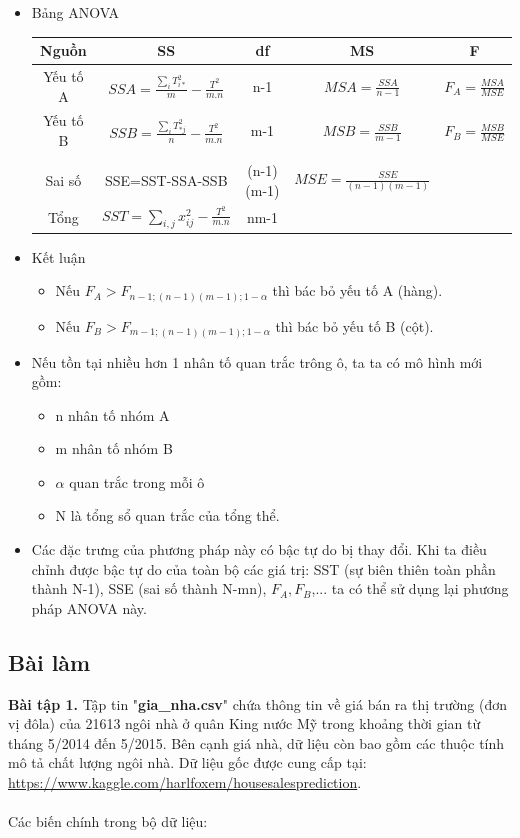 \documentclass[a4paper]{article}
\theoremstyle{definition}
\begin{document}
\begin{itemize}
\begin{itemize}
\item Bảng ANOVA\\
\begin{tabular}{|c|c|c|c|c|}
     \hline
     Nguồn & SS & df & MS & F\\
     \hline
     Yếu tố A & $SSA=\frac{\displaystyle\sum_{i}T^2_{i*}}{m}-\frac{T^2}{m.n}$ & n-1 & $MSA=\frac{SSA}{n-1}$ & $F_A=\frac{MSA}{MSE}$\\
     \hline
     Yếu tố B & $SSB=\frac{\displaystyle\sum_{i}T^2_{*j}}{n}-\frac{T^2}{m.n}$ & m-1 & $MSB=\frac{SSB}{m-1}$ & $F_B=\frac{MSB}{MSE}$\\
     \hline
      & & & & 
     \\Sai số & SSE=SST-SSA-SSB & (n-1)(m-1) & $MSE=\frac{SSE}{(n-1)(m-1)}$ & \\
     \hline
     Tổng & $SST=\displaystyle\sum_{i,j}x^2_{ij}-\frac{T^2}{m.n}$ & nm-1 & & \\
     \hline
\end{tabular}
\item Kết luận
\begin{itemize}
    \item Nếu $F_A>F_{n-1;(n-1)(m-1);1-\alpha}$ thì bác bỏ yếu tố A (hàng).
    \item Nếu $F_B>F_{m-1;(n-1)(m-1);1-\alpha}$ thì bác bỏ yếu tố B (cột).
\end{itemize}
\item Nếu tồn tại nhiều hơn 1 nhân tố quan trắc trông ô, ta ta có mô hình mới gồm:
\begin{itemize}
    \item n nhân tố nhóm A
    \item m nhân tố nhóm B
    \item $\alpha$ quan trắc trong mỗi ô
    \item N là tổng sổ quan trắc của tổng thể.
\end{itemize}
\item Các đặc trưng của phương pháp này có bậc tự do bị thay đổi. Khi ta điều chỉnh được bậc tự do của toàn bộ các giá trị: SST (sự biên thiên toàn phần thành N-1), SSE (sai số thành N-mn), $F_A, F_B$,... ta có thể sử dụng lại phương pháp ANOVA này.
\end{itemize}

\subsection{Bài làm}

    \textbf{Bài tập 1.} Tập tin "\textbf{gia\_nha.csv}" chứa thông tin về giá bán ra thị trường (đơn vị đôla) của 21613 ngôi nhà ở quân King nước Mỹ trong khoảng thời gian từ tháng 5/2014 đến 5/2015. Bên cạnh giá nhà, dữ liệu còn bao gồm các thuộc tính mô tả chất lượng ngôi nhà. Dữ liệu gốc được cung cấp tại: \href{https://www.kaggle.com/harlfoxem/housesalesprediction}{https://www.kaggle.com/harlfoxem/housesalesprediction}.\\ \\
Các biến chính trong bộ dữ liệu:
\begin{itemize}
    

\end{itemize}
\end{itemize}
\end{document}
